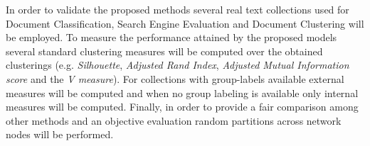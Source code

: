 \documentclass[10pt]{article}
\begin{document}

In order to validate the proposed methods several real text collections used for Document Classification, Search Engine Evaluation and Document Clustering will be employed. To measure the performance attained by the proposed models several standard clustering measures will be computed over the obtained clusterings (e.g. \textit{Silhouette}, \textit{Adjusted Rand Index}, \textit{Adjusted Mutual Information score} and the \textit{V measure}). For collections with group-labels available external
measures will be computed and when no group labeling is available only internal measures will be computed. Finally, in order to provide a fair comparison among other methods and an objective evaluation random partitions across network nodes will be performed.


%
% 
\end{document}
